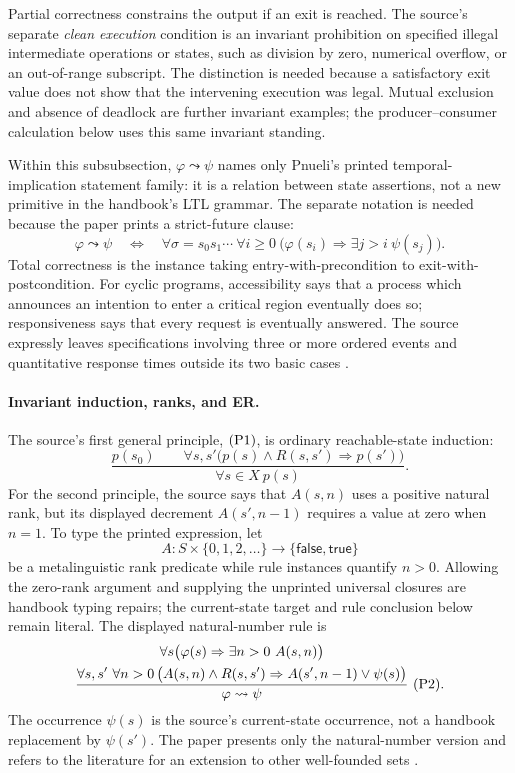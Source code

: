 Partial correctness constrains the output if an exit is reached.  The source's
separate \emph{clean execution} condition is an invariant prohibition on
specified illegal intermediate operations or states, such as division by
zero, numerical overflow, or an out-of-range subscript.  The distinction is
needed because a satisfactory exit value does not show that the intervening
execution was legal.  Mutual exclusion and absence of deadlock are further
invariant examples; the producer--consumer calculation below uses this same
invariant standing.

Within this subsubsection, \(\varphi\leadsto\psi\) names only Pnueli's printed
temporal-implication statement family: it is a relation between state
assertions, not a new primitive in the handbook's LTL grammar.  The separate
notation is needed because the paper prints a strict-future clause:
\[
 \varphi\leadsto\psi
 \quad\Longleftrightarrow\quad
 \forall\sigma=s_0s_1\cdots\ \forall i\ge0\
 \bigl(\varphi(s_i)\Rightarrow
       \exists j>i\ \psi(s_j)\bigr).
\]
Total correctness is the instance taking entry-with-precondition to
exit-with-postcondition.  For cyclic programs, accessibility says that a
process which announces an intention to enter a critical region eventually
does so; responsiveness says that every request is eventually answered.
The source expressly leaves specifications involving three or more ordered
events and quantitative response times outside its two basic cases
\cite[pp.~48--49]{Pnueli1977}.

\paragraph{Invariant induction, ranks, and ER.}
The source's first general principle, \(({\rm P1})\), is ordinary
reachable-state induction:
\[
 \frac{
   p(s_0)
   \qquad
   \forall s,s'\bigl(p(s)\land R(s,s')\Rightarrow p(s')\bigr)}
  {\forall s\in X\ p(s)}.
\]
For the second principle, the source says that \(A(s,n)\) uses a positive
natural rank, but its displayed decrement \(A(s',n-1)\) requires a value at
zero when \(n=1\).  To type the printed expression, let
\[
 A:S\times\{0,1,2,\ldots\}
   \longrightarrow\{\mathsf{false},\mathsf{true}\}
\]
be a metalinguistic rank predicate while rule instances quantify \(n>0\).
Allowing the zero-rank argument and supplying the unprinted universal closures
are handbook typing repairs; the current-state target and rule conclusion below
remain literal.  The displayed natural-number rule is
\[
 \frac{
  \begin{gathered}
   \forall s\bigl(\varphi(s)\Rightarrow
                    \exists n>0\ A(s,n)\bigr)\\
   \forall s,s'\ \forall n>0\,
   \bigl(A(s,n)\land R(s,s')\Rightarrow
         A(s',n-1)\lor\psi(s)\bigr)
  \end{gathered}}
  {\varphi\leadsto\psi}\ ({\rm P2}).
\]
The occurrence \(\psi(s)\) is the source's current-state occurrence, not a
handbook replacement by \(\psi(s')\).  The paper presents only the
natural-number version and refers to the literature for an extension to other
well-founded sets \cite[p.~49]{Pnueli1977}.

